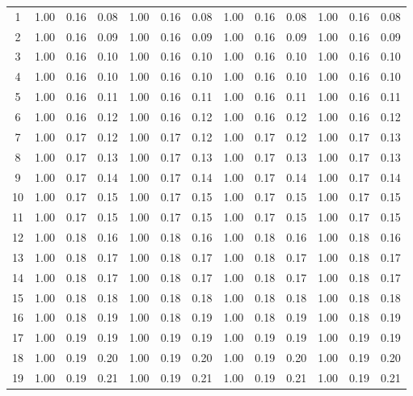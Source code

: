 \begin{landscape}
\begin{center}
\begin{longtable}{|c|c|c|c|c|c|c|c|c|c|c|c|c|}
\hline
\endlastfoot %
\label{tab:numeros} %
 1 & 1.00 & 0.16 & 0.08 & 1.00 & 0.16 & 0.08 & 1.00 & 0.16 & 0.08 & 1.00 & 0.16 & 0.08 \\
 2 & 1.00 & 0.16 & 0.09 & 1.00 & 0.16 & 0.09 & 1.00 & 0.16 & 0.09 & 1.00 & 0.16 & 0.09 \\
 3 & 1.00 & 0.16 & 0.10 & 1.00 & 0.16 & 0.10 & 1.00 & 0.16 & 0.10 & 1.00 & 0.16 & 0.10 \\
 4 & 1.00 & 0.16 & 0.10 & 1.00 & 0.16 & 0.10 & 1.00 & 0.16 & 0.10 & 1.00 & 0.16 & 0.10 \\
 5 & 1.00 & 0.16 & 0.11 & 1.00 & 0.16 & 0.11 & 1.00 & 0.16 & 0.11 & 1.00 & 0.16 & 0.11 \\
 6 & 1.00 & 0.16 & 0.12 & 1.00 & 0.16 & 0.12 & 1.00 & 0.16 & 0.12 & 1.00 & 0.16 & 0.12 \\
 7 & 1.00 & 0.17 & 0.12 & 1.00 & 0.17 & 0.12 & 1.00 & 0.17 & 0.12 & 1.00 & 0.17 & 0.13 \\
 8 & 1.00 & 0.17 & 0.13 & 1.00 & 0.17 & 0.13 & 1.00 & 0.17 & 0.13 & 1.00 & 0.17 & 0.13 \\
 9 & 1.00 & 0.17 & 0.14 & 1.00 & 0.17 & 0.14 & 1.00 & 0.17 & 0.14 & 1.00 & 0.17 & 0.14 \\
10 & 1.00 & 0.17 & 0.15 & 1.00 & 0.17 & 0.15 & 1.00 & 0.17 & 0.15 & 1.00 & 0.17 & 0.15 \\
11 & 1.00 & 0.17 & 0.15 & 1.00 & 0.17 & 0.15 & 1.00 & 0.17 & 0.15 & 1.00 & 0.17 & 0.15 \\
12 & 1.00 & 0.18 & 0.16 & 1.00 & 0.18 & 0.16 & 1.00 & 0.18 & 0.16 & 1.00 & 0.18 & 0.16 \\
13 & 1.00 & 0.18 & 0.17 & 1.00 & 0.18 & 0.17 & 1.00 & 0.18 & 0.17 & 1.00 & 0.18 & 0.17 \\
14 & 1.00 & 0.18 & 0.17 & 1.00 & 0.18 & 0.17 & 1.00 & 0.18 & 0.17 & 1.00 & 0.18 & 0.17 \\
15 & 1.00 & 0.18 & 0.18 & 1.00 & 0.18 & 0.18 & 1.00 & 0.18 & 0.18 & 1.00 & 0.18 & 0.18 \\
16 & 1.00 & 0.18 & 0.19 & 1.00 & 0.18 & 0.19 & 1.00 & 0.18 & 0.19 & 1.00 & 0.18 & 0.19 \\
17 & 1.00 & 0.19 & 0.19 & 1.00 & 0.19 & 0.19 & 1.00 & 0.19 & 0.19 & 1.00 & 0.19 & 0.19 \\
18 & 1.00 & 0.19 & 0.20 & 1.00 & 0.19 & 0.20 & 1.00 & 0.19 & 0.20 & 1.00 & 0.19 & 0.20 \\
19 & 1.00 & 0.19 & 0.21 & 1.00 & 0.19 & 0.21 & 1.00 & 0.19 & 0.21 & 1.00 & 0.19 & 0.21 \\

\end{longtable}
\end{center}
\end{landscape}
